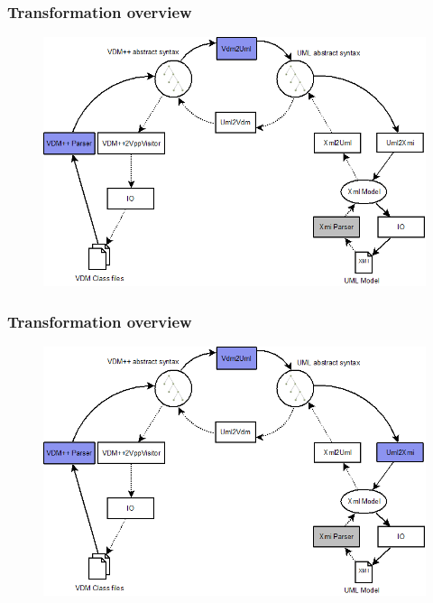 %
%
\frame
{
  \frametitle{Transformation overview}
\begin{center}
\begin{figure}
\includegraphics[width=\textwidth]{images/OverviewOverMappingToVDM2.png}
\end{figure}
\end{center}
}

%
%
\frame
{
  \frametitle{Transformation overview}
\begin{center}
\begin{figure}
\includegraphics[width=\textwidth]{images/OverviewOverMappingToVDM3.png}
\end{figure}
\end{center}
}

